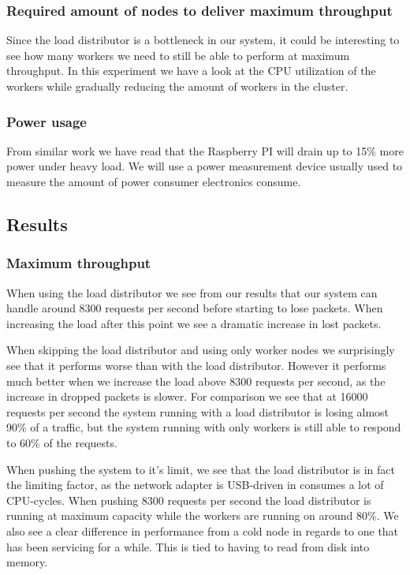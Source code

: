 \subsubsection{Required amount of nodes to deliver maximum throughput}
Since the load distributor is a bottleneck in our system, it could be interesting to see how many workers we need to still be able to perform at maximum throughput. In this experiment we have a look at the CPU utilization of the workers while gradually reducing the amount of workers in the cluster.

\subsubsection{Power usage}
From similar work\cite{RPI_BEOWULF} we have read that the Raspberry PI will drain up to 15\% more power under heavy load. We will use a power measurement device usually used to measure the amount of power consumer electronics consume. 

\subsection{Results}
\subsubsection{Maximum throughput}
When using the load distributor we see from our results that our system can handle around 8300 requests per second before starting to lose packets. When increasing the load after this point we see a dramatic increase in lost packets. 

When skipping the load distributor and using only worker nodes we surprisingly see that it performs worse than with the load distributor. However it performs much better when we increase the load above 8300 requests per second, as the increase in dropped packets is slower. For comparison we see that at 16000 requests per second the system running with a load distributor is losing almost 90\% of a traffic, but the system running with only workers is still able to respond to 60\% of the requests. 

When pushing the system to it's limit, we see that the load distributor is in fact the limiting factor, as the network adapter is USB-driven in consumes a lot of CPU-cycles. When pushing 8300 requests per second the load distributor is running at maximum capacity while the workers are running on around 80\%. We also see a clear difference in performance from a cold node in regards to one that has been servicing for a while. This is tied to having to read from disk into memory.

